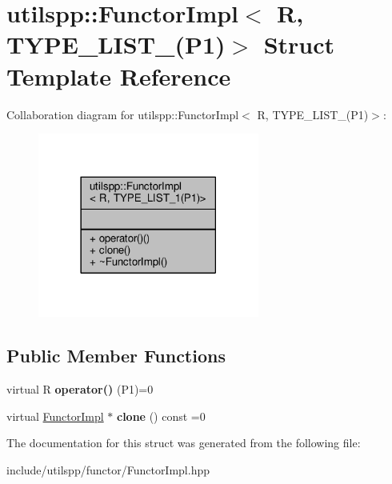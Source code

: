 \hypertarget{structutilspp_1_1FunctorImpl_3_01R_00_01TYPE__LIST__1_07P1_08_4}{\section{utilspp\-:\-:Functor\-Impl$<$ R, T\-Y\-P\-E\-\_\-\-L\-I\-S\-T\-\_(P1)$>$ Struct Template Reference}
\label{structutilspp_1_1FunctorImpl_3_01R_00_01TYPE__LIST__1_07P1_08_4}
}


Collaboration diagram for utilspp\-:\-:Functor\-Impl$<$ R, T\-Y\-P\-E\-\_\-\-L\-I\-S\-T\-\_(P1)$>$\-:\nopagebreak
\begin{figure}[H]
\begin{center}
\leavevmode
\includegraphics[width=206pt]{structutilspp_1_1FunctorImpl_3_01R_00_01TYPE__LIST__1_07P1_08_4__coll__graph}
\end{center}
\end{figure}
\subsection*{Public Member Functions}
\begin{DoxyCompactItemize}
\item 
\hypertarget{structutilspp_1_1FunctorImpl_3_01R_00_01TYPE__LIST__1_07P1_08_4_abf621bfda0afeb269275de7972a5c779}{virtual R {\bfseries operator()} (P1)=0}\label{structutilspp_1_1FunctorImpl_3_01R_00_01TYPE__LIST__1_07P1_08_4_abf621bfda0afeb269275de7972a5c779}

\item 
\hypertarget{structutilspp_1_1FunctorImpl_3_01R_00_01TYPE__LIST__1_07P1_08_4_aae926b6655a4b24e0321a64a8343e5e6}{virtual \hyperlink{structutilspp_1_1FunctorImpl}{Functor\-Impl} $\ast$ {\bfseries clone} () const =0}\label{structutilspp_1_1FunctorImpl_3_01R_00_01TYPE__LIST__1_07P1_08_4_aae926b6655a4b24e0321a64a8343e5e6}

\end{DoxyCompactItemize}


The documentation for this struct was generated from the following file\-:\begin{DoxyCompactItemize}
\item 
include/utilspp/functor/Functor\-Impl.\-hpp\end{DoxyCompactItemize}
